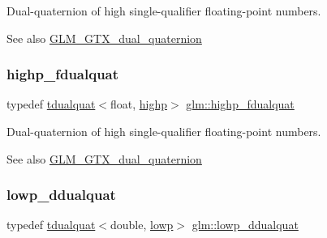 Dual-\/quaternion of high single-\/qualifier floating-\/point numbers.

\begin{DoxySeeAlso}{See also}
\mbox{\hyperlink{group__gtx__dual__quaternion}{G\+L\+M\+\_\+\+G\+T\+X\+\_\+dual\+\_\+quaternion}} 
\end{DoxySeeAlso}
\mbox{\label{group__gtx__dual__quaternion_ga8c46d61c38b2b6d9c5091c667dd20fe8}} 
\subsubsection{\texorpdfstring{highp\+\_\+fdualquat}{highp\_fdualquat}}
{\footnotesize\ttfamily typedef \mbox{\hyperlink{structglm_1_1tdualquat}{tdualquat}}$<$float, \mbox{\hyperlink{namespaceglm_a36ed105b07c7746804d7fdc7cc90ff25ac6f7eab42eacbb10d59a58e95e362074}{highp}}$>$ \mbox{\hyperlink{group__gtx__dual__quaternion_ga8c46d61c38b2b6d9c5091c667dd20fe8}{glm\+::highp\+\_\+fdualquat}}}

Dual-\/quaternion of high single-\/qualifier floating-\/point numbers.

\begin{DoxySeeAlso}{See also}
\mbox{\hyperlink{group__gtx__dual__quaternion}{G\+L\+M\+\_\+\+G\+T\+X\+\_\+dual\+\_\+quaternion}} 
\end{DoxySeeAlso}
\mbox{\label{group__gtx__dual__quaternion_ga361a2ea6cce1446a8ab7e7803156c16c}} 
\subsubsection{\texorpdfstring{lowp\+\_\+ddualquat}{lowp\_ddualquat}}
{\footnotesize\ttfamily typedef \mbox{\hyperlink{structglm_1_1tdualquat}{tdualquat}}$<$double, \mbox{\hyperlink{namespaceglm_a36ed105b07c7746804d7fdc7cc90ff25ae161af3fc695e696ce3bf69f7332bc2d}{lowp}}$>$ \mbox{\hyperlink{group__gtx__dual__quaternion_ga361a2ea6cce1446a8ab7e7803156c16c}{glm\+::lowp\+\_\+ddualquat}}}


